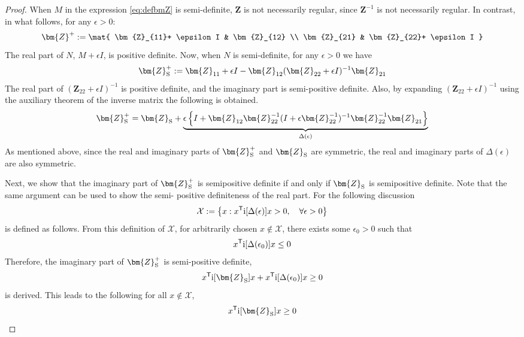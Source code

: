 \documentclass[graybox, envcountchap]{svmult}
\begin{document}
\begin{proof}
When $M$ in the expression \ref{eq:defbmZ} is semi-definite, $\bm{Z}$ is not necessarily regular, since $\bm{Z}^{-1}$ is not necessarily regular.
In contrast, in what follows, for any $\epsilon >0$:
\begin{equation*}
\bm{Z}^{+}
:=
\mat{
\bm{Z}_{11}+ \epsilon I & \bm{Z}_{12} \\
\bm{Z}_{21} & \bm{Z}_{22}+ \epsilon I
}
\end{equation*}
The real part of $N$, $M+\epsilon I$, is positive definite.
Now, when $N$ is semi-definite, for any $\epsilon >0$ we have
\begin{equation*}
\bm{Z}_{\rm S}^{+}:=\bm{Z}_{11} + \epsilon I - \bm{Z}_{12} (\bm{Z}_{22}+ \epsilon I)^{-1}\bm{Z}_{21}
\end{equation*}
The real part of $(\bm{Z}_{22}+ \epsilon I)^{-1}$ is positive definite, and the imaginary part is semi-positive definite.
Also, by expanding $(\bm{Z}_{22}+ \epsilon I)^{-1}$ using the auxiliary theorem of the inverse matrix the following is obtained.
\begin{equation*}
\bm{Z}_{\rm S}^{+}=
\bm{Z}_{\rm S}
+ \underbrace{
\epsilon
\left\{
I + \bm{Z}_{12} \bm{Z}_{22}^{-1}
(I +\epsilon \bm{Z}_{22}^{-1} )^{-1}
\bm{Z}_{22}^{-1}\bm{Z}_{21}
\right\}
}_{\Delta(\epsilon)}
\end{equation*}
As mentioned above, since the real and imaginary parts of $\bm{Z}_{\rm S}^{+}$ and $\bm{Z}_{\rm S}$ are symmetric,
the real and imaginary parts of $\Delta(\epsilon)$ are also symmetric.

Next, we show that the imaginary part of $\bm{Z}_{\rm S}^{+}$ is semipositive definite if and only if $\bm{Z}_{\rm S}$ is semipositive definite.
Note that the same argument can be used to show the semi- positive definiteness of the real part.
For the following discussion
\begin{equation*}
\mathcal{X} := \left\{
x: 
x^{\sf T} {\rm i}[\Delta (\epsilon)] x >0
,\quad 
\forall \epsilon >0
\right\}
\end{equation*}
is defined as follows.
From this definition of $\mathcal{X}$, for arbitrarily chosen $x \notin \mathcal{X}$, there exists some $\epsilon_0 >0$ such that
\[
x^{\sf T} {\rm i}[\Delta(\epsilon_0)]x \leq 0
\]
Therefore, the imaginary part of $ \bm{Z}_{\rm S}^{+} $ is semi-positive definite, 
\begin{equation*}
x^{\sf T} \imag [\bm{Z}_{\rm S}] x + x^{\sf T} \imag[\Delta(\epsilon_0)]x \geq 0
\end{equation*}
is derived.
This leads to the following for all $x \notin \mathcal{X}$, 
\begin{equation}\label{eq:xZxgeq}
x^{\sf T}\imag[\bm{Z}_{\rm S}] x \geq 0
\end{equation}


\end{proof}
\end{document}
